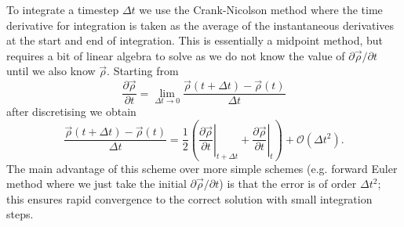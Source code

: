 \documentclass[12pt]{report}
\begin{document}
To integrate a timestep $\Delta t$ we use the Crank-Nicolson \cite{Crank1947} method where the time derivative for integration is taken as the average of the instantaneous derivatives at the start and end of integration.
This is essentially a midpoint method, but requires a bit of linear algebra to solve as we do not know the value of $\partial \vec{\rho} / \partial t$ until we also know $\vec{\rho}$.
Starting from
\begin{equation}
  \frac{\partial \vec{\rho}}{\partial t} =
  \lim_{\Delta t \to 0} \frac{\vec{\rho}(t + \Delta t) - \vec{\rho}(t)}{\Delta t}
\end{equation}
after discretising we obtain
\begin{equation}
  \frac{\vec{\rho}(t + \Delta t) - \vec{\rho}(t)}{\Delta t}
  =
  \frac{1}{2}
  \left(
  \left. \frac{\partial \vec{\rho}}{\partial t} \right|_{t + \Delta t}
  +
  \left. \frac{\partial \vec{\rho}}{\partial t} \right|_t
  \right)
  + \mathcal{O}(\Delta t^2).
\end{equation}
The main advantage of this scheme over more simple schemes (e.g. forward Euler method where we just take the initial $\partial \vec{\rho} / \partial t$) is that the error is of order $\Delta t^2$; this ensures rapid convergence to the correct solution with small integration steps.
\end{document}
